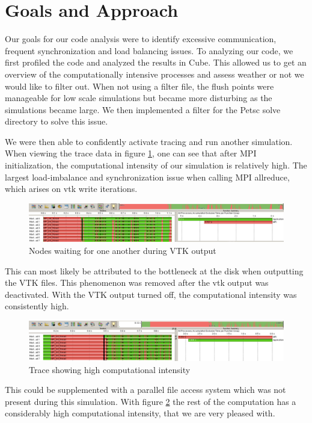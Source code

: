 \section{Goals and Approach}

Our goals for our code analysis were to identify excessive communication,
frequent synchronization and load balancing issues. To analyzing our code, we
first profiled the code and analyzed the results in Cube. This allowed us to get
an overview of the computationally intensive processes and assess weather or not
we would like to filter out. When not using a filter file, the flush points were
manageable for low scale simulations but became more disturbing as the
simulations became large. We then implemented a filter for the Petsc solve
directory to solve this issue.

We were then able to confidently activate tracing and run another
simulation. When viewing the trace data in figure \ref{fig:scorep-trace-data},
one can see that after MPI initialization, the computational intensity of our
simulation is relatively high. The largest load-imbalance and synchronization
issue when calling MPI allreduce, which arises on vtk write iterations.

\begin{figure}[h]
  \centering
  \includegraphics[width=\textwidth]{FIGURES/scorep/trace-data}
  \caption{Nodes waiting for one another during VTK output}
  \label{fig:scorep-trace-data}
\end{figure}

This can most likely be attributed to the bottleneck at the disk when outputting
the VTK files. This phenomenon was removed after the vtk output was
deactivated. With the VTK output turned off, the computational intensity was
consistently high.

\begin{figure}[h]
  \centering
  \includegraphics[width=\textwidth]{FIGURES/scorep/reference}
  \caption{Trace showing high computational intensity}
  \label{fig:scorep-reference}
\end{figure}

This could be supplemented with a parallel file access system which was not
present during this simulation. With figure \ref{fig:scorep-reference} the rest
of the computation has a considerably high computational intensity, that we are
very pleased with.
